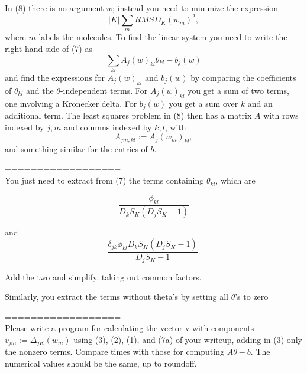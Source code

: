 \documentclass[12pt]{article}
\begin{document}
In (8) there is no argument $w$; instead you need to minimize the expression
\begin{equation}
    |K| \sum_m RMSD_K(w_m)^2,
\end{equation}
where $m$ labels the molecules. To find the linear system you need to write the right hand side of (7) as
\begin{equation}
    \sum_{kl} A_j(w)_{kl} \theta_{kl} -b_j(w)
\end{equation}
and find the expressions for $A_j(w)_{kl}$ and $b_j(w)$ by comparing the coefficients of $\theta_{kl}$ and the $\theta$-independent terms. For $A_j(w)_{kl}$ you get a sum of two terms, one involving a Kronecker delta. For $b_j(w)$ you get a sum over $k$ and an additional term.
The least squares problem in (8) then has a matrix $A$ with rows indexed by $j,m$ and columns indexed by $k,l$, with
\begin{equation}
    A_{jm,kl}:=A_j(w_m)_{kl},
\end{equation}
and something similar for the entries of $b$.

================== \\
You just need to extract from (7) the terms containing $\theta_{kl}$, which are

\begin{equation}
    \frac{\phi_{kl}}{D_kS_K(D_jS_K-1)}
\end{equation}


and
\begin{equation}
    \frac{\delta_{jk}\phi_{kl}D_kS_K(D_jS_K-1)}{D_jS_K-1}.
\end{equation}


Add the two and simplify, taking out common factors.

Similarly, you extract the terms without theta's by setting all $\theta$'s to zero

================== \\

Please write a program for calculating the vector v with components $v_{jm}:=\Delta_{jK}(w_m)$ using (3), (2), (1), and (7a) of your writeup, adding in (3) only the nonzero terms. Compare times with those for computing $A\theta-b$. The numerical values should be the same, up to roundoff.

\fi
\end{document}
